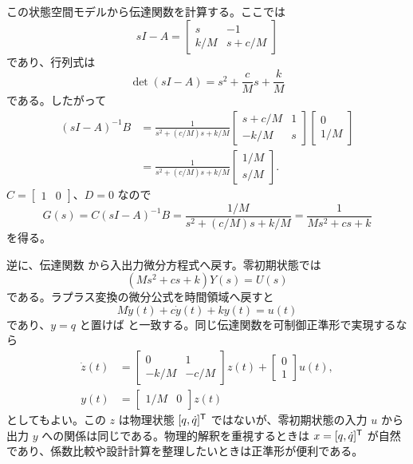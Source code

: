 この状態空間モデルから伝達関数を計算する。ここでは
\begin{equation}
  sI-A=
  \begin{bmatrix}
    s&-1\\
    k/M&s+c/M
  \end{bmatrix}
\end{equation}
であり、行列式は
\begin{equation}
  \det(sI-A)=s^2+\frac{c}{M}s+\frac{k}{M}
\end{equation}
である。したがって
\begin{align}
  (sI-A)^{-1}B
  &=
  \frac{1}{s^2+(c/M)s+k/M}
  \begin{bmatrix}
    s+c/M&1\\
    -k/M&s
  \end{bmatrix}
  \begin{bmatrix}
    0\\
    1/M
  \end{bmatrix}\\
  &=
  \frac{1}{s^2+(c/M)s+k/M}
  \begin{bmatrix}
    1/M\\
    s/M
  \end{bmatrix}.
\end{align}
$C=\begin{bmatrix}1&0\end{bmatrix}$、$D=0$ なので
\begin{equation}
  G(s)=C(sI-A)^{-1}B
  =
  \frac{1/M}{s^2+(c/M)s+k/M}
  =
  \frac{1}{Ms^2+cs+k}
  \label{eq:msd-transfer-from-state}
\end{equation}
を得る。

逆に、伝達関数  から入出力微分方程式へ戻す。零初期状態では
\begin{equation}
  (Ms^2+cs+k)Y(s)=U(s)
\end{equation}
である。ラプラス変換の微分公式を時間領域へ戻すと
\begin{equation}
  M\ddot{y}(t)+c\dot{y}(t)+ky(t)=u(t)
\end{equation}
であり、$y=q$ と置けば  と一致する。同じ伝達関数を可制御正準形で実現するなら
\begin{align}
  \dot{z}(t)&=
  \begin{bmatrix}
    0&1\\
    -k/M&-c/M
  \end{bmatrix}z(t)
  +\begin{bmatrix}
    0\\
    1
  \end{bmatrix}u(t),\\
  y(t)&=\begin{bmatrix}1/M&0\end{bmatrix}z(t)
\end{align}
としてもよい。この $z$ は物理状態 $[q,\dot{q}]^{\mathsf{T}}$ ではないが、零初期状態の入力 $u$ から出力 $y$ への関係は同じである。物理的解釈を重視するときは $x=[q,\dot{q}]^{\mathsf{T}}$ が自然であり、係数比較や設計計算を整理したいときは正準形が便利である。
